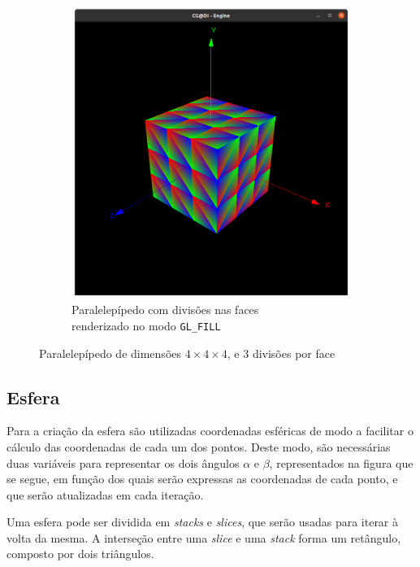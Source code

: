 \documentclass[a4paper, 11pt]{article}
\begin{document}
\begin{figure}[H]
\begin{subfigure}{.5\textwidth}
    \includegraphics[width=\textwidth]{img/box_div_preenchida.png}
    \caption{Paralelepípedo com divisões nas faces \\renderizado no modo \texttt{GL\_FILL}}
\end{subfigure}
\caption{Paralelepípedo de dimensões $4\times4\times4$, e 3 divisões por face}
\end{figure}

\subsection{Esfera}

Para a criação da esfera são utilizadas coordenadas esféricas de modo a facilitar o cálculo 
das coordenadas de cada um dos pontos. Deste modo, são necessárias duas variáveis para representar
os dois ângulos $\alpha$ e $\beta$, representados na figura que se segue, em função dos quais serão
expressas as coordenadas de cada ponto, e que serão atualizadas em cada iteração.

Uma esfera pode ser dividida em \textit{stacks} e \textit{slices}, que serão usadas para iterar à 
volta da mesma. A interseção entre uma \textit{slice} e uma \textit{stack} forma um retângulo,
composto por dois triângulos.
\end{document}

